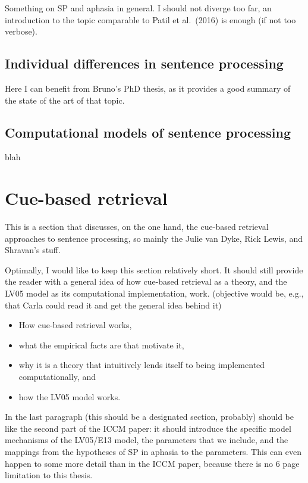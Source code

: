 \documentclass{scrartcl}
\begin{document}
Something on SP and aphasia in general. I should not diverge too far, an introduction to 
the topic comparable to Patil et al.\ (2016) is enough (if not too verbose).

\subsection{Individual differences in sentence processing}

Here I can benefit from Bruno's PhD thesis, as it provides a good summary of the state of
the art of that topic.

\subsection{Computational models of sentence processing}

blah

\section{Cue-based retrieval}

This is a section that discusses, on the one hand, the cue-based retrieval approaches to 
sentence processing, so mainly the Julie van Dyke, Rick Lewis, and Shravan's stuff.

Optimally, I would like to keep this section relatively short. It should still provide the
reader with a general idea of how cue-based retrieval as a theory, and the LV05 model as its
computational implementation, work. (objective would be, e.g., that Carla could read it and get
the general idea behind it)

\begin{itemize}
  \item How cue-based retrieval works,
  \item what the empirical facts are that motivate it,
  \item why it is a theory that intuitively lends itself to being implemented computationally, and
  \item how the LV05 model works.
\end{itemize}

In the last paragraph (this should be a designated section, probably) should be like the second part 
of the ICCM paper: it should introduce the specific model mechanisms of the LV05/E13 model, the 
parameters that we include, and the mappings from the hypotheses of SP in aphasia to the parameters.
This can even happen to some more detail than in the ICCM paper, because there is no 6 page limitation
to this thesis.
\end{document}
